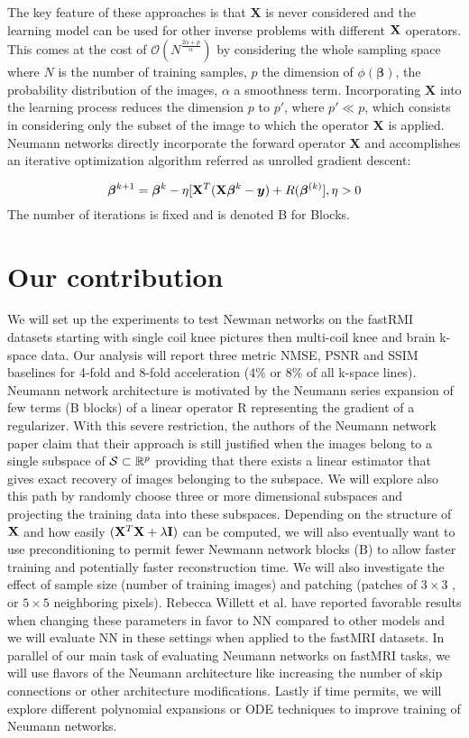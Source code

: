 \documentclass[12pt,twoside]{article}
\begin{document}
 The key feature of these approaches is that $ \mathbf{X}$ is never considered and the learning model can be used for other inverse problems with different ${\mathbf X}$ operators.
 This comes at the cost of $\mathcal{O}(N^{ \frac{2 \alpha + p} {\alpha} })$ by considering the whole sampling space
  where $N$ is the number of training samples, $p$ the dimension of $\phi(\bm{\beta})$, the probability distribution of the images, $\alpha$ a smoothness term.
  Incorporating $\mathbf{X}$ into the learning process reduces the dimension $p$ to $p'$, where $p' \ll p$, which consists in considering only the subset of the image to which the operator $\mathbf{X}$ is applied.
  Neumann networks directly incorporate the forward operator $\mathbf{X}$ and accomplishes an iterative optimization algorithm referred as unrolled gradient descent:
  
  $$ \bm{\beta}^{k+1} =  \bm{\beta}^{k} -\eta [{\mathbf X}^T ({\mathbf X} \bm{\beta}^{k} - \bm{y}) + R(\bm{\beta}^{(k)}], \eta > 0$$
  The number of iterations is fixed and is denoted B for Blocks.
  
\section{Our contribution}
We will set up the experiments to test Newman networks on the fastRMI datasets starting with single coil knee pictures then multi-coil knee and brain k-space data.
Our analysis will report three metric NMSE, PSNR and SSIM baselines for 4-fold and 8-fold acceleration (4\% or 8\% of all k-space lines).
Neumann network architecture is motivated by the Neumann series expansion of few terms (B blocks) of a linear operator R representing the gradient of a regularizer.
With this severe restriction, the authors of the Neumann network paper claim that their approach is still justified when the images belong to a single subspace of $\mathcal{S} \subset \mathbb{R}^p$
providing that there exists a linear estimator that gives exact recovery of images belonging to the subspace. We will explore also this path by randomly choose three or more dimensional subspaces and
projecting the training data into these subspaces. Depending on the structure of ${\mathbf X}$ and how easily $({\mathbf X}^T {\mathbf X} + \lambda {\mathbf I})$ can be computed, 
we will also eventually want to use preconditioning to permit fewer Newmann network blocks (B)
to allow faster training and potentially faster reconstruction time. We will also investigate the effect of sample size (number of training images) and patching (patches of $3 \times 3$ , or $5 \times 5$ neighboring pixels).
\cite{DBLP:journals/corr/abs-1901-03707} Rebecca Willett et al. have reported favorable results when changing these parameters in favor to NN compared to other models and we will evaluate NN in these settings when applied to the fastMRI datasets.
In parallel of our main task of evaluating Neumann networks on fastMRI tasks,  we will use flavors of the Neumann architecture like increasing the number of skip connections or other architecture modifications. 
Lastly if time permits, we will explore different polynomial expansions or ODE techniques to improve training of Neumann networks.
\end{document}

